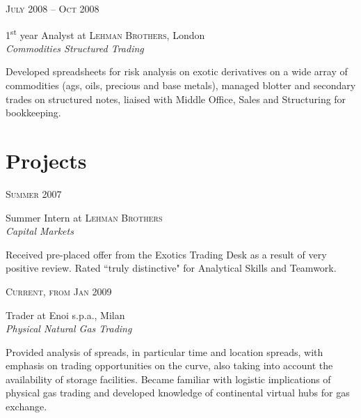 \documentclass[10pt]{article}
\begin{document}
{\begin{minipage}[t]{0.5\textwidth}
{\raggedleft\textsc{July 2008 -- Oct 2008}\par}

{\raggedright\large 1\textsuperscript{st} year Analyst at \textsc{Lehman Brothers}, London\\
\textit{Commodities Structured Trading}\\[5pt]}

\normalsize{Developed spreadsheets for risk analysis on exotic derivatives on a wide array of commodities (ags, oils, precious and base metals), managed blotter and secondary trades on structured notes, liaised with Middle Office, Sales and Structuring for bookkeeping.}\\

\section{Projects} 


{\raggedleft\textsc{Summer 2007}\par}

{\raggedright\large Summer Intern at \textsc{Lehman Brothers}\\
\textit{Capital Markets}\\[5pt]}

\normalsize{Received pre-placed offer from the Exotics Trading Desk as a result of very positive review. Rated ``truly distinctive" for Analytical Skills and Teamwork.}\\


{\raggedleft\textsc{Current, from Jan 2009}\par}

{\raggedright\large Trader at Enoi s.p.a., Milan\\
\textit{Physical Natural Gas Trading}\\[5pt]}

\normalsize{Provided analysis of spreads, in particular time and location spreads, with emphasis on trading opportunities on the curve, also taking into account the availability of storage facilities. Became familiar with logistic implications of physical gas trading and developed knowledge of continental virtual hubs for gas exchange.}\\


\end{minipage}}
\end{document}
